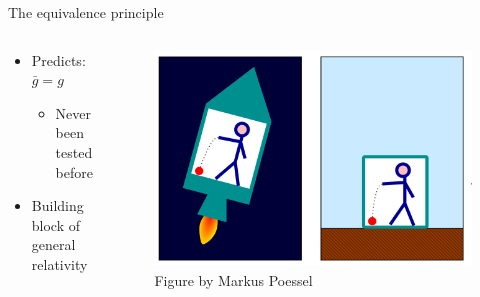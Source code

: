 \documentclass{beamer}
\begin{document}
  
\begin{frame}{\centering The equivalence principle}
  \begin{columns}
    \begin{column}{0.39\textwidth}
        \begin{itemize}
        \item{Predicts: $\bar g= g$}
          \begin{itemize}
          \item{Never been tested before}
          \end{itemize}
        \item{Building block of general relativity}
      \end{itemize}
    \end{column}
    \begin{column}{0.65\textwidth}
      \begin{figure}
        \includegraphics[width=\textwidth]{fig/elevatorGravity}\\\tiny{Figure by Markus Poessel}
      \end{figure}
    \end{column}
  \end{columns}
  \end{frame}
\end{document}
